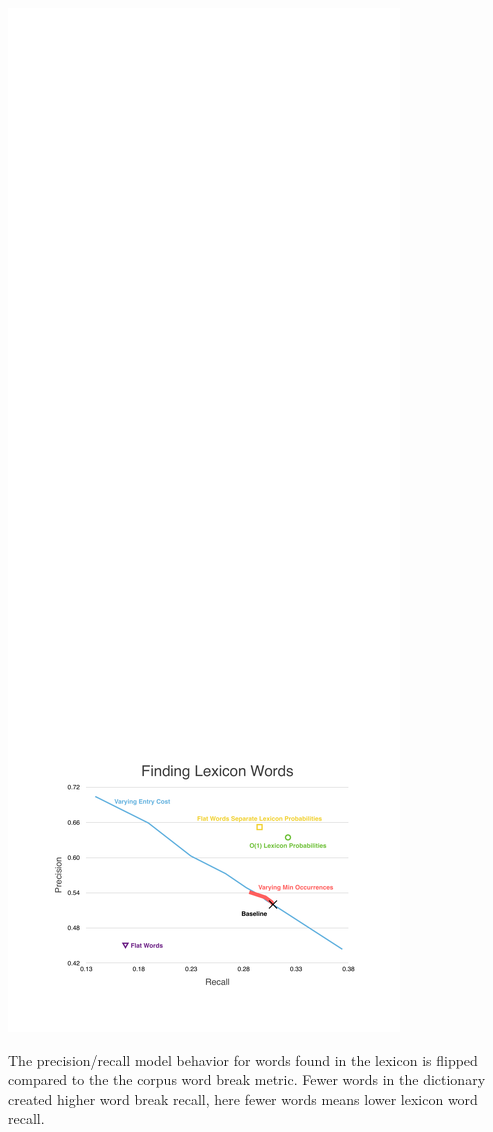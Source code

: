 \documentclass[11pt, oneside, fleqn]{article}
\begin{document}
  \includegraphics[scale=0.85]{./figure/finding_lexiocn_words.pdf}

	The precision/recall model behavior for words found in the lexicon is flipped compared to the the corpus word break metric. Fewer words in the dictionary created higher word break recall, here fewer words means lower lexicon word recall.
\end{document}
